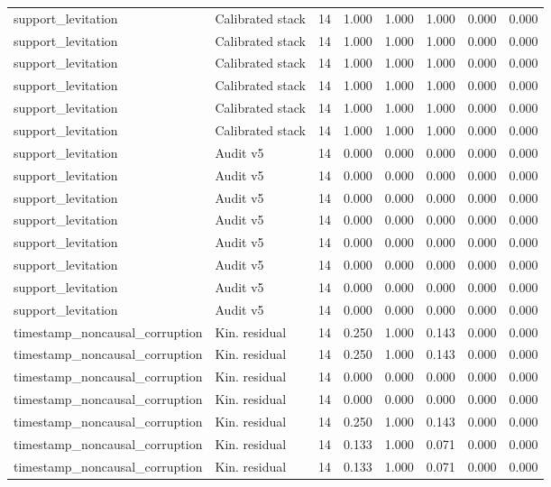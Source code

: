 {\begin{longtable}{llrrrrrr}
support\_levitation & Calibrated stack & 14 & 1.000 & 1.000 & 1.000 & 0.000 & 0.000 \\
support\_levitation & Calibrated stack & 14 & 1.000 & 1.000 & 1.000 & 0.000 & 0.000 \\
support\_levitation & Calibrated stack & 14 & 1.000 & 1.000 & 1.000 & 0.000 & 0.000 \\
support\_levitation & Calibrated stack & 14 & 1.000 & 1.000 & 1.000 & 0.000 & 0.000 \\
support\_levitation & Calibrated stack & 14 & 1.000 & 1.000 & 1.000 & 0.000 & 0.000 \\
support\_levitation & Calibrated stack & 14 & 1.000 & 1.000 & 1.000 & 0.000 & 0.000 \\
support\_levitation & Audit v5 & 14 & 0.000 & 0.000 & 0.000 & 0.000 & 0.000 \\
support\_levitation & Audit v5 & 14 & 0.000 & 0.000 & 0.000 & 0.000 & 0.000 \\
support\_levitation & Audit v5 & 14 & 0.000 & 0.000 & 0.000 & 0.000 & 0.000 \\
support\_levitation & Audit v5 & 14 & 0.000 & 0.000 & 0.000 & 0.000 & 0.000 \\
support\_levitation & Audit v5 & 14 & 0.000 & 0.000 & 0.000 & 0.000 & 0.000 \\
support\_levitation & Audit v5 & 14 & 0.000 & 0.000 & 0.000 & 0.000 & 0.000 \\
support\_levitation & Audit v5 & 14 & 0.000 & 0.000 & 0.000 & 0.000 & 0.000 \\
support\_levitation & Audit v5 & 14 & 0.000 & 0.000 & 0.000 & 0.000 & 0.000 \\
timestamp\_noncausal\_corruption & Kin. residual & 14 & 0.250 & 1.000 & 0.143 & 0.000 & 0.000 \\
timestamp\_noncausal\_corruption & Kin. residual & 14 & 0.250 & 1.000 & 0.143 & 0.000 & 0.000 \\
timestamp\_noncausal\_corruption & Kin. residual & 14 & 0.000 & 0.000 & 0.000 & 0.000 & 0.000 \\
timestamp\_noncausal\_corruption & Kin. residual & 14 & 0.000 & 0.000 & 0.000 & 0.000 & 0.000 \\
timestamp\_noncausal\_corruption & Kin. residual & 14 & 0.250 & 1.000 & 0.143 & 0.000 & 0.000 \\
timestamp\_noncausal\_corruption & Kin. residual & 14 & 0.133 & 1.000 & 0.071 & 0.000 & 0.000 \\
timestamp\_noncausal\_corruption & Kin. residual & 14 & 0.133 & 1.000 & 0.071 & 0.000 & 0.000 \\

\end{longtable}}
